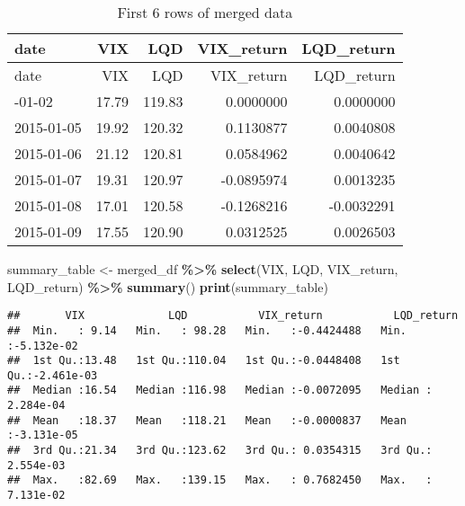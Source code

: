 \documentclass[
]{article}
\newenvironment{Shaded}{\begin{snugshade}}{\end{snugshade}}
\newcommand{\FunctionTok}[1]{\textcolor[rgb]{0.13,0.29,0.53}{\textbf{#1}}}
\newcommand{\NormalTok}[1]{#1}
\newcommand{\OtherTok}[1]{\textcolor[rgb]{0.56,0.35,0.01}{#1}}
\newcommand{\SpecialCharTok}[1]{\textcolor[rgb]{0.81,0.36,0.00}{\textbf{#1}}}
\begin{document}
\begin{longtable}[]{@{}lrrrr@{}}
\caption{First 6 rows of merged data}\tabularnewline
\toprule\noalign{}
date & VIX & LQD & VIX\_return & LQD\_return \\
\midrule\noalign{}
\endfirsthead
\toprule\noalign{}
date & VIX & LQD & VIX\_return & LQD\_return \\
\midrule\noalign{}
\endhead
\bottomrule\noalign{}
\endlastfoot
2015-01-02 & 17.79 & 119.83 & 0.0000000 & 0.0000000 \\
2015-01-05 & 19.92 & 120.32 & 0.1130877 & 0.0040808 \\
2015-01-06 & 21.12 & 120.81 & 0.0584962 & 0.0040642 \\
2015-01-07 & 19.31 & 120.97 & -0.0895974 & 0.0013235 \\
2015-01-08 & 17.01 & 120.58 & -0.1268216 & -0.0032291 \\
2015-01-09 & 17.55 & 120.90 & 0.0312525 & 0.0026503 \\
\end{longtable}

\begin{Shaded}
\begin{Highlighting}[]
\NormalTok{summary\_table }\OtherTok{\textless{}{-}}\NormalTok{ merged\_df }\SpecialCharTok{\%\textgreater{}\%} \FunctionTok{select}\NormalTok{(VIX, LQD, VIX\_return, LQD\_return) }\SpecialCharTok{\%\textgreater{}\%} \FunctionTok{summary}\NormalTok{()}
\FunctionTok{print}\NormalTok{(summary\_table)}
\end{Highlighting}
\end{Shaded}

\begin{verbatim}
##       VIX             LQD           VIX_return           LQD_return        
##  Min.   : 9.14   Min.   : 98.28   Min.   :-0.4424488   Min.   :-5.132e-02  
##  1st Qu.:13.48   1st Qu.:110.04   1st Qu.:-0.0448408   1st Qu.:-2.461e-03  
##  Median :16.54   Median :116.98   Median :-0.0072095   Median : 2.284e-04  
##  Mean   :18.37   Mean   :118.21   Mean   :-0.0000837   Mean   :-3.131e-05  
##  3rd Qu.:21.34   3rd Qu.:123.62   3rd Qu.: 0.0354315   3rd Qu.: 2.554e-03  
##  Max.   :82.69   Max.   :139.15   Max.   : 0.7682450   Max.   : 7.131e-02
\end{verbatim}
\end{document}
